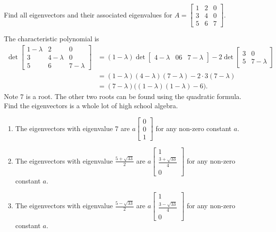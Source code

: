\documentclass[../main.tex]{subfiles}
\begin{document}
\begin{exercise}
  Find all eigenvectors and their associated eigenvalues for \(A = \begin{bmatrix} 1 & 2 & 0 \\ 3 & 4 & 0 \\ 5 & 6 & 7 \end{bmatrix}\).

  \begin{solution}
    The characteristic polynomial is
    \begin{align*}
      \det 
      \begin{bmatrix}
        1 - \lambda & 2 & 0 \\
        3 & 4 - \lambda & 0 \\
        5 & 6 & 7 - \lambda
      \end{bmatrix} 
      &= (1 - \lambda) 
      \det
      \begin{bmatrix}
        4 - \lambda & 0 
        6 & 7 - \lambda
      \end{bmatrix}
      - 
      2 \det
      \begin{bmatrix}
        3 & 0 \\
        5 & 7 - \lambda
      \end{bmatrix}
      \\
      &= (1 - \lambda) (4 - \lambda) (7 - \lambda) - 2 \cdot 3 (7 - \lambda) \\
      &= (7 - \lambda)\big((1 - \lambda) (1 - \lambda) - 6\big).
    \end{align*}
    Note \(7\) is a root. The other two roots can be found using the quadratic formula. Find the eigenvectors is a whole lot of high school algebra.

    \begin{enumerate}
      \item The eigenvectors with eigenvalue \(7\) are \(a \begin{bmatrix} 0 \\ 0 \\ 1 \end{bmatrix}\) for any non-zero constant \(a\).
      \item The eigenvectors with eigenvalue \(\frac{5 + \sqrt{33}}{2}\) are \(a \begin{bmatrix} 1 \\ \frac{3 + \sqrt{33}}{4} \\ 0 \end{bmatrix}\) for any non-zero constant \(a\).
      \item The eigenvectors with eigenvalue \(\frac{5 - \sqrt{33}}{2}\) are \(a \begin{bmatrix} 1 \\ \frac{3 - \sqrt{33}}{4} \\ 0 \end{bmatrix}\) for any non-zero constant \(a\).
    \end{enumerate}


\end{solution}
\end{exercise}
\end{document}
